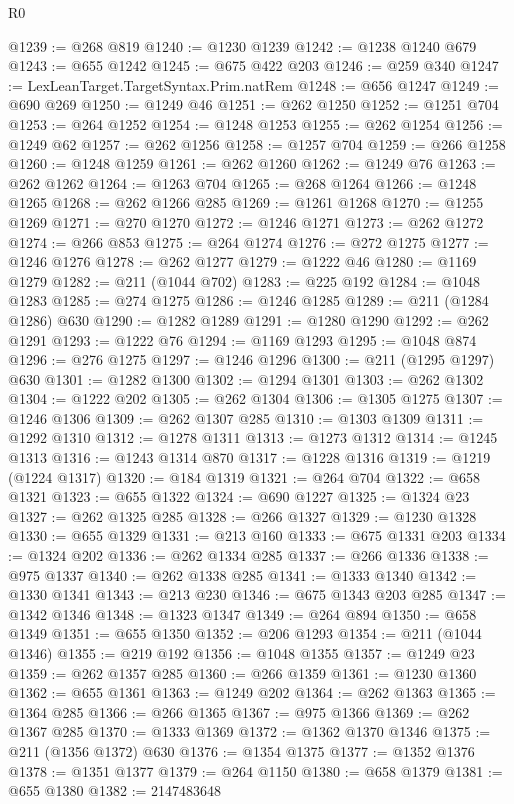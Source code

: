 \begin{lexlean}{R0}
\begin{coremodule}
@1239 := @268 @819
@1240 := @1230 @1239
@1242 := @1238 @1240 @679
@1243 := @655 @1242
@1245 := @675 @422 @203
@1246 := @259 @340
@1247 := LexLeanTarget.TargetSyntax.Prim.natRem
@1248 := @656 @1247
@1249 := @690 @269
@1250 := @1249 @46
@1251 := @262 @1250
@1252 := @1251 @704
@1253 := @264 @1252
@1254 := @1248 @1253
@1255 := @262 @1254
@1256 := @1249 @62
@1257 := @262 @1256
@1258 := @1257 @704
@1259 := @266 @1258
@1260 := @1248 @1259
@1261 := @262 @1260
@1262 := @1249 @76
@1263 := @262 @1262
@1264 := @1263 @704
@1265 := @268 @1264
@1266 := @1248 @1265
@1268 := @262 @1266 @285
@1269 := @1261 @1268
@1270 := @1255 @1269
@1271 := @270 @1270
@1272 := @1246 @1271
@1273 := @262 @1272
@1274 := @266 @853
@1275 := @264 @1274
@1276 := @272 @1275
@1277 := @1246 @1276
@1278 := @262 @1277
@1279 := @1222 @46
@1280 := @1169 @1279
@1282 := @211 (@1044 @702)
@1283 := @225 @192
@1284 := @1048 @1283
@1285 := @274 @1275
@1286 := @1246 @1285
@1289 := @211 (@1284 @1286) @630
@1290 := @1282 @1289
@1291 := @1280 @1290
@1292 := @262 @1291
@1293 := @1222 @76
@1294 := @1169 @1293
@1295 := @1048 @874
@1296 := @276 @1275
@1297 := @1246 @1296
@1300 := @211 (@1295 @1297) @630
@1301 := @1282 @1300
@1302 := @1294 @1301
@1303 := @262 @1302
@1304 := @1222 @202
@1305 := @262 @1304
@1306 := @1305 @1275
@1307 := @1246 @1306
@1309 := @262 @1307 @285
@1310 := @1303 @1309
@1311 := @1292 @1310
@1312 := @1278 @1311
@1313 := @1273 @1312
@1314 := @1245 @1313
@1316 := @1243 @1314 @870
@1317 := @1228 @1316
@1319 := @1219 (@1224 @1317)
@1320 := @184 @1319
@1321 := @264 @704
@1322 := @658 @1321
@1323 := @655 @1322
@1324 := @690 @1227
@1325 := @1324 @23
@1327 := @262 @1325 @285
@1328 := @266 @1327
@1329 := @1230 @1328
@1330 := @655 @1329
@1331 := @213 @160
@1333 := @675 @1331 @203
@1334 := @1324 @202
@1336 := @262 @1334 @285
@1337 := @266 @1336
@1338 := @975 @1337
@1340 := @262 @1338 @285
@1341 := @1333 @1340
@1342 := @1330 @1341
@1343 := @213 @230
@1346 := @675 @1343 @203 @285
@1347 := @1342 @1346
@1348 := @1323 @1347
@1349 := @264 @894
@1350 := @658 @1349
@1351 := @655 @1350
@1352 := @206 @1293
@1354 := @211 (@1044 @1346)
@1355 := @219 @192
@1356 := @1048 @1355
@1357 := @1249 @23
@1359 := @262 @1357 @285
@1360 := @266 @1359
@1361 := @1230 @1360
@1362 := @655 @1361
@1363 := @1249 @202
@1364 := @262 @1363
@1365 := @1364 @285
@1366 := @266 @1365
@1367 := @975 @1366
@1369 := @262 @1367 @285
@1370 := @1333 @1369
@1372 := @1362 @1370 @1346
@1375 := @211 (@1356 @1372) @630
@1376 := @1354 @1375
@1377 := @1352 @1376
@1378 := @1351 @1377
@1379 := @264 @1150
@1380 := @658 @1379
@1381 := @655 @1380
@1382 := 2147483648

\end{coremodule}
\end{lexlean}

